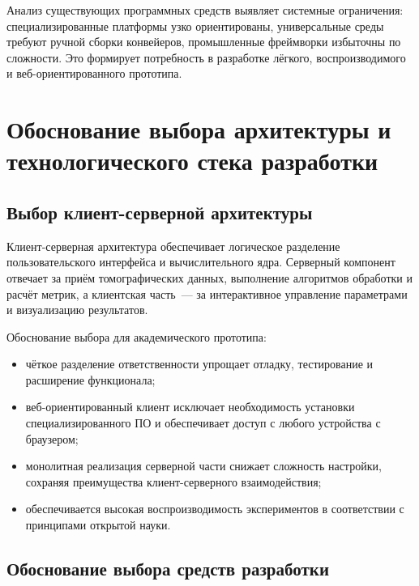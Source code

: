 \documentclass[14pt,a4paper]{extreport}
\begin{document}
Анализ существующих программных средств выявляет системные ограничения: специализированные платформы узко ориентированы, универсальные среды требуют ручной сборки конвейеров, промышленные фреймворки избыточны по сложности. Это формирует потребность в разработке лёгкого, воспроизводимого и веб-ориентированного прототипа.

\section{Обоснование выбора архитектуры и технологического стека разработки}

\subsection{Выбор клиент-серверной архитектуры}

Клиент-серверная архитектура обеспечивает логическое разделение пользовательского интерфейса и вычислительного ядра. Серверный компонент отвечает за приём томографических данных, выполнение алгоритмов обработки и расчёт метрик, а клиентская часть~--- за интерактивное управление параметрами и визуализацию результатов.

Обоснование выбора для академического прототипа:
\begin{itemize}
  \item чёткое разделение ответственности упрощает отладку, тестирование и расширение функционала;
  \item веб-ориентированный клиент исключает необходимость установки специализированного ПО и обеспечивает доступ с любого устройства с браузером;
  \item монолитная реализация серверной части снижает сложность настройки, сохраняя преимущества клиент-серверного взаимодействия;
  \item обеспечивается высокая воспроизводимость экспериментов в соответствии с принципами открытой науки.
\end{itemize}

\subsection{Обоснование выбора средств разработки}
\end{document}
